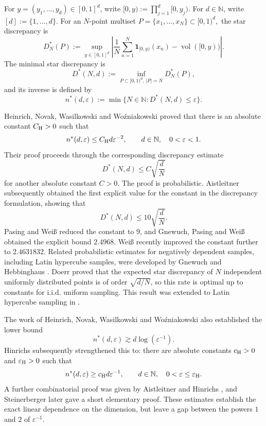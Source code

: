 \documentclass[11pt]{article}
\theoremstyle{plain}
\theoremstyle{remark}
\theoremstyle{definition}
\newcommand{\1}{\mathbf{1}}
\newcommand{\N}{\mathbb{N}}
\newcommand{\vol}{\operatorname{vol}}
\begin{document}
For \(y=(y_1,\dots,y_d)\in[0,1]^d\), write
$
 [0,y):=\prod_{j=1}^d[0,y_j). 
$ For \(d\in\mathbb{N} \), write \([d]:=\{1,\dots,d\}\).
For an \(N\)-point multiset
$
 P=\{x_1,\dots,x_N\}\subset[0,1)^d,
$
the star discrepancy is
\begin{equation*}
 D_N^{\ast}(P)
 :=
 \sup_{y\in[0,1]^d}
 \left|
 \frac1N\sum_{n=1}^N\1_{[0,y)}(x_n)
 -\vol([0,y))
 \right|.
\end{equation*}
The minimal star discrepancy is
\begin{equation*}
 D^{\ast}(N,d)
 :=
 \inf_{P\subset[0,1)^d,\,|P|=N}D_N^{\ast}(P),
\end{equation*}
and its inverse is defined by
\begin{equation*}
 n^{\ast}(d,\varepsilon)
 :=
 \min\{N\in\N: D^{\ast}(N,d)\le\varepsilon\}.
\end{equation*}

Heinrich, Novak, Wasilkowski and Wo\'{z}niakowski \cite{HNWW01} proved that there is an absolute constant \(C_{\rm H}>0\) such that
\begin{equation}\label{eq:HNWW-upper-intro}
 n^{\ast}(d,\varepsilon)
 \le C_{\rm H}d\varepsilon^{-2},
 \qquad d\in\N,\quad 0<\varepsilon<1.
\end{equation}
Their proof proceeds through the corresponding discrepancy estimate
\[
 D^\ast(N,d)\le C\sqrt{\frac dN}
\]
for another absolute constant \(C>0\). The proof is probabilistic.  Aistleitner \cite{Ais11} subsequently obtained the first explicit value for the constant in the discrepancy formulation, showing that
\[
 D^{\ast}(N,d)\le 10\sqrt{\frac dN}.
\]
Pasing and Wei\ss{} \cite{PW20} reduced the constant to \(9\), and Gnewuch, Pasing and Wei\ss{} \cite{GPW21} obtained the explicit bound \(2.4968\). Wei\ss{} \cite{W26} recently improved the constant further to $2.4631832$.  Related probabilistic estimates for negatively dependent samples, including Latin hypercube samples, were developed by Gnewuch and Hebbinghaus \cite{GH21}.  Doerr \cite{Doe14} proved that the expected star discrepancy of \(N\) independent uniformly distributed points is of order \(\sqrt{d/N}\), so this rate is optimal up to constants for i.i.d. uniform sampling. This result was extended to Latin hypercube sampling in \cite{DDG18}.

The work of Heinrich, Novak, Wasilkowski and Wo\'{z}niakowski \cite{HNWW01} also established the lower bound
\[
 n^{\ast}(d,\varepsilon)\gtrsim d\log(\varepsilon^{-1}).
\]
Hinrichs \cite{H04} subsequently strengthened this to: there are absolute constants \(c_{\rm H}>0\) and \(\varepsilon_{\rm H}>0\) such that
\begin{equation}\label{eq:Hinrichs-lower-intro}
 n^{\ast}(d,\varepsilon)
 \ge c_{\rm H}d\varepsilon^{-1},
 \qquad d\in\N,\quad 0<\varepsilon\le\varepsilon_{\rm H}.
\end{equation}
A further combinatorial proof was given by Aistleitner and Hinrichs \cite{AH18}, and Steinerberger \cite{S23} later gave a short elementary proof.  These estimates establish the exact linear dependence on the dimension, but leave a gap between the powers \(1\) and \(2\) of \(\varepsilon^{-1}\).
\end{document}
